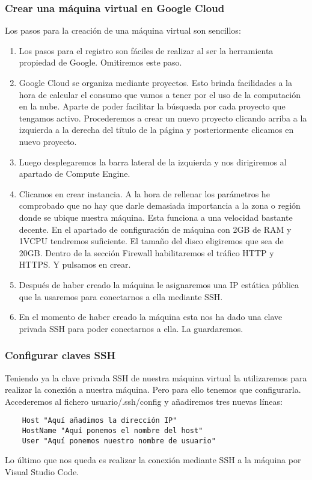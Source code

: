 \subsubsection{Crear una máquina virtual en Google Cloud}
Los pasos para la creación de una máquina virtual son sencillos:

\begin{enumerate}
    \item Los pasos para el registro son fáciles de realizar al ser la herramienta propiedad de Google. Omitiremos este paso.
    \item Google Cloud se organiza mediante proyectos. Esto brinda facilidades a la hora de calcular el consumo que vamos a tener por el uso de la computación en la nube. Aparte de poder facilitar la búsqueda por cada proyecto que tengamos activo. Procederemos a crear un nuevo proyecto clicando arriba a la izquierda a la derecha del título de la página y posteriormente clicamos en nuevo proyecto.
    \item Luego desplegaremos la barra lateral de la izquierda y nos dirigiremos al apartado de Compute Engine.
    \item Clicamos en crear instancia. A la hora de rellenar los parámetros he comprobado que no hay que darle demasiada importancia a la zona o región donde se ubique nuestra máquina. Esta funciona a una velocidad bastante decente. En el apartado de configuración de máquina con 2GB de RAM y 1VCPU tendremos suficiente. El tamaño del disco eligiremos que sea de 20GB. Dentro de la sección Firewall habilitaremos el tráfico HTTP y HTTPS. Y pulsamos en crear.
    \item Después de haber creado la máquina le asignaremos una IP estática pública que la usaremos para conectarnos a ella mediante SSH.
    \item En el momento de haber creado la máquina esta nos ha dado una clave privada SSH para poder conectarnos a ella. La guardaremos.
\end{enumerate}

\subsubsection{Configurar claves SSH}

Teniendo ya la clave privada SSH de nuestra máquina virtual la utilizaremos para realizar la conexión a nuestra máquina. Pero para ello tenemos que configurarla. Accederemos al fichero usuario/.ssh/config y añadiremos tres nuevas líneas:
\begin{verbatim}
    Host "Aquí añadimos la dirección IP"
    HostName "Aquí ponemos el nombre del host"
    User "Aquí ponemos nuestro nombre de usuario"
\end{verbatim}
Lo último que nos queda es realizar la conexión mediante SSH a la máquina por Visual Studio Code.

